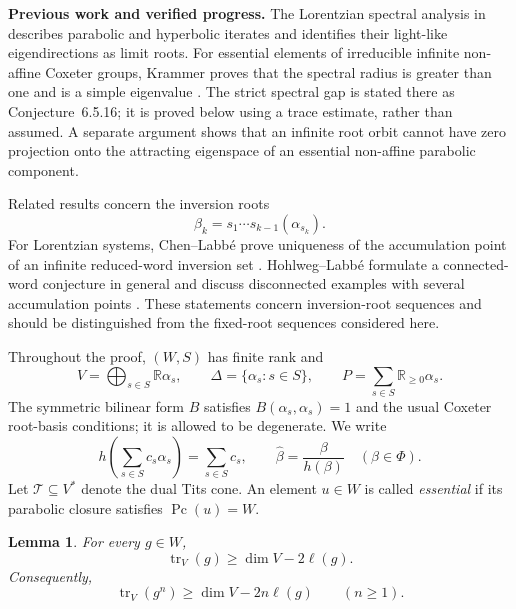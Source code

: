 \documentclass[11pt,reqno]{amsart}
\theoremstyle{plain}
\newtheorem{lemma}[theorem]{Lemma}
\theoremstyle{definition}
\theoremstyle{remark}
\numberwithin{equation}{section}
\begin{document}
\par\medskip
\noindent\textbf{Previous work and verified progress.}
The Lorentzian spectral analysis in
\cite[Theorems~3.8 and~3.10]{ChenLabbe2017}
describes parabolic and hyperbolic iterates and identifies
their light-like eigendirections as limit roots.
For essential elements of irreducible infinite non-affine
Coxeter groups, Krammer proves that the spectral radius is
greater than one and is a simple eigenvalue
\cite[Section~6.5]{Krammer2009}.
The strict spectral gap is stated there as
Conjecture~6.5.16; it is proved below using a trace estimate,
rather than assumed.
A separate argument shows that an infinite root orbit cannot
have zero projection onto the attracting eigenspace of an
essential non-affine parabolic component.

Related results concern the inversion roots
\[
\beta_k=s_1\cdots s_{k-1}(\alpha_{s_k}).
\]
For Lorentzian systems, Chen--Labb\'e prove uniqueness of the
accumulation point of an infinite reduced-word inversion set
\cite[Theorem~2.9]{ChenLabbe2017}.
Hohlweg--Labb\'e formulate a connected-word conjecture in general
and discuss disconnected examples with several accumulation
points \cite[Section~4.2, Conjecture~3]{HL2016}.
These statements concern inversion-root sequences and should
be distinguished from the fixed-root sequences considered here.

\par\medskip
Throughout the proof, $(W,S)$ has finite rank and
\[
V=\bigoplus_{s\in S}\mathbb R\alpha_s,
\qquad
\Delta=\{\alpha_s:s\in S\},
\qquad
P=\sum_{s\in S}\mathbb R_{\geq0}\alpha_s.
\]
The symmetric bilinear form $B$ satisfies
$B(\alpha_s,\alpha_s)=1$ and the usual Coxeter root-basis
conditions; it is allowed to be degenerate.
We write
\[
h\left(\sum_{s\in S}c_s\alpha_s\right)
=\sum_{s\in S}c_s,
\qquad
\widehat{\beta}=\frac{\beta}{h(\beta)}
\quad(\beta\in\Phi).
\]
Let $\mathcal T\subseteq V^*$ denote the dual Tits cone.
An element $u\in W$ is called \emph{essential} if its parabolic
closure satisfies $\operatorname{Pc}(u)=W$.

\begin{lemma}
\label{lem:periodic-trace-bound}
For every $g\in W$,
\[
\operatorname{tr}_V(g)\geq \dim V-2\ell(g).
\]
Consequently,
\[
\operatorname{tr}_V(g^n)
\geq \dim V-2n\ell(g)
\qquad(n\geq1).
\]
\end{lemma}
\end{document}
